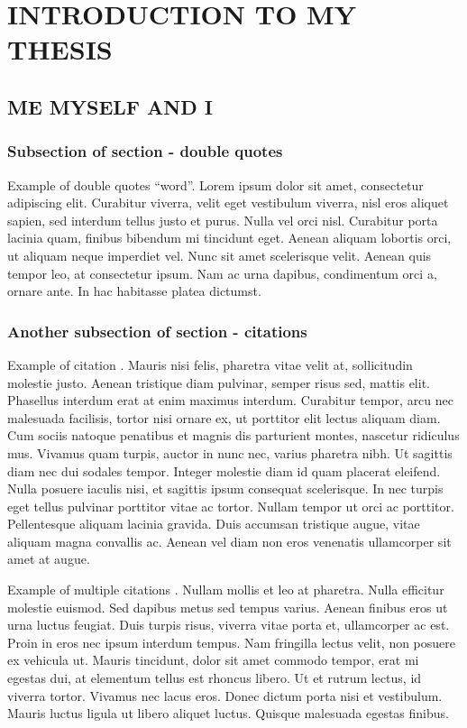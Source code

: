 \chapter{INTRODUCTION TO MY THESIS}
\section{ME MYSELF AND I }
\subsection{Subsection of section - double quotes}
Example of double quotes ``word''. Lorem ipsum dolor sit amet, consectetur adipiscing elit. Curabitur viverra, velit eget vestibulum viverra, nisl eros aliquet sapien, sed interdum tellus justo et purus. Nulla vel orci nisl. Curabitur porta lacinia quam, finibus bibendum mi tincidunt eget. Aenean aliquam lobortis orci, ut aliquam neque imperdiet vel. Nunc sit amet scelerisque velit. Aenean quis tempor leo, at consectetur ipsum. Nam ac urna dapibus, condimentum orci a, ornare ante. In hac habitasse platea dictumst. 
\subsection{Another subsection of section - citations}
Example of citation \citep{altschul1997gapped}. Mauris nisi felis, pharetra vitae velit at, sollicitudin molestie justo. Aenean tristique diam pulvinar, semper risus sed, mattis elit. Phasellus interdum erat at enim maximus interdum. Curabitur tempor, arcu nec malesuada facilisis, tortor nisi ornare ex, ut porttitor elit lectus aliquam diam. Cum sociis natoque penatibus et magnis dis parturient montes, nascetur ridiculus mus. Vivamus quam turpis, auctor in nunc nec, varius pharetra nibh. Ut sagittis diam nec dui sodales tempor. Integer molestie diam id quam placerat eleifend. Nulla posuere iaculis nisi, et sagittis ipsum consequat scelerisque. In nec turpis eget tellus pulvinar porttitor vitae ac tortor. Nullam tempor ut orci ac porttitor. Pellentesque aliquam lacinia gravida. Duis accumsan tristique augue, vitae aliquam magna convallis ac. Aenean vel diam non eros venenatis ullamcorper sit amet at augue. 


Example of multiple citations \citep{altschul1997gapped,baker2007novel}. Nullam mollis et leo at pharetra. Nulla efficitur molestie euismod. Sed dapibus metus sed tempus varius. Aenean finibus eros ut urna luctus feugiat. Duis turpis risus, viverra vitae porta et, ullamcorper ac est. Proin in eros nec ipsum interdum tempus. Nam fringilla lectus velit, non posuere ex vehicula ut. Mauris tincidunt, dolor sit amet commodo tempor, erat mi egestas dui, at elementum tellus est rhoncus libero. Ut et rutrum lectus, id viverra tortor. Vivamus nec lacus eros. Donec dictum porta nisi et vestibulum. Mauris luctus ligula ut libero aliquet luctus. Quisque malesuada egestas finibus. 

